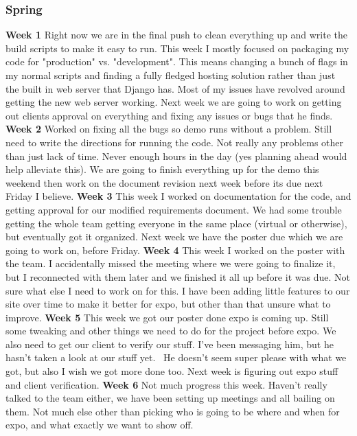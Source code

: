 \documentclass[onecolumn, draftclsnofoot, 10pt, compsoc]{IEEEtran}
\begin{document}
\subsubsection{Spring}
\textbf{Week 1}
Right now we are in the final push to clean everything up and write the build scripts to make it easy to run. This week I mostly focused on packaging my code for "production" vs. "development". This means changing a bunch of flags in my normal scripts and finding a fully fledged hosting solution rather than just the built in web server that Django has. Most of my issues have revolved around getting the new web server working. Next week we are going to work on getting out clients approval on everything and fixing any issues or bugs that he finds.
\newline
\textbf{Week 2}
Worked on fixing all the bugs so demo runs without a problem. Still need to write the directions for running the code. Not really any problems other than just lack of time. Never enough hours in the day (yes planning ahead would help alleviate this). We are going to finish everything up for the demo this weekend then work on the document revision next week before its due next Friday I believe. 
\newline
\textbf{Week 3}
This week I worked on documentation for the code, and getting approval for our modified requirements document. We had some trouble getting the whole team getting everyone in the same place (virtual or otherwise), but eventually got it organized. Next week we have the poster due which we are going to work on, before Friday.
\newline
\textbf{Week 4}
This week I worked on the poster with the team. I accidentally missed the meeting where we were going to finalize it, but I reconnected with them later and we finished it all up before it was due. Not sure what else I need to work on for this. I have been adding little features to our site over time to make it better for expo, but other than that unsure what to improve.
\newline
\textbf{Week 5}
This week we got our poster done expo is coming up. Still some tweaking and other things we need to do for the project before expo. We also need to get our client to verify our stuff. I've been messaging him, but he hasn't taken a look at our stuff yet.  He doesn't seem super please with what we got, but also I wish we got more done too. Next week is figuring out expo stuff and client verification.
\newline
\textbf{Week 6}
Not much progress this week. Haven't really talked to the team either, we have been setting up meetings and all bailing on them. Not much else other than picking who is going to be where and when for expo, and what exactly we want to show off.
\end{document}
